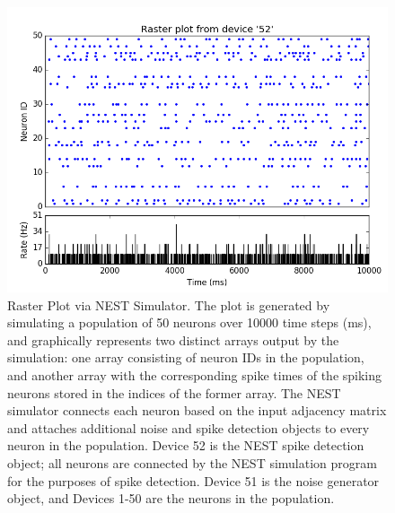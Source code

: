 \documentclass[11pt,titlepage]{article}
\begin{document}
\begin{figure}[H]
\centering
	\includegraphics[scale=0.5]{./Figures/figure_1.png} 
	\caption[Raster Plot via NEST Simulator.]{Raster Plot via NEST Simulator. The plot is generated by simulating a population of 50 neurons over 10000 time steps (ms), and graphically represents two distinct arrays output by the simulation: one array consisting of neuron IDs in the population, and another array with the corresponding spike times of the spiking neurons stored in the indices of the former array. The NEST simulator connects each neuron based on the input adjacency matrix and attaches additional noise and spike detection objects to every neuron in the population. Device 52 is the NEST spike detection object; all neurons are connected by the NEST simulation program for the purposes of spike detection. Device 51 is the noise generator object, and Devices 1-50 are the neurons in the population. }
\end{figure}


\end{document}
